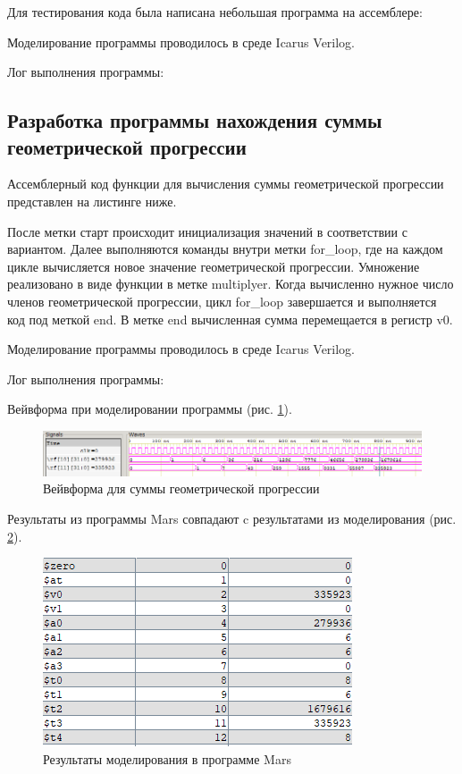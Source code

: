 \documentclass[a4paper,14pt]{article}
\begin{document}
	Для тестирования кода была написана небольшая программа на ассемблере:
		
	{\small {}}
	
	Моделирование программы проводилось в среде Icarus Verilog.
	
	Лог выполнения программы:
	
	{\small {}}
	
	\subsection{Разработка программы нахождения суммы геометрической прогрессии}
	
	Ассемблерный код функции для вычисления суммы геометрической прогрессии представлен на листинге ниже.
	
	{\small {}}
	
	После метки старт происходит инициализация значений в соответствии с вариантом.
	Далее выполняются команды внутри метки for\_loop, где на каждом цикле вычисляется новое значение геометрической прогрессии.
	Умножение реализовано в виде функции в метке multiplyer.
	Когда вычисленно нужное число членов геометрической прогрессии, цикл for\_loop завершается и выполняется код под меткой end.
	В метке end вычисленная сумма перемещается в регистр v0.
	
	Моделирование программы проводилось в среде Icarus Verilog.
	
	Лог выполнения программы:
	
	{\small {}}
	
	Вейвформа при моделировании программы (рис. \ref{fig:99wvf}).
	
	\begin{figure}[H]
		\centering
		\includegraphics[width=0.95\linewidth]{images/99_wvf}
		\caption{Вейвформа для суммы геометрической прогрессии}
		\label{fig:99wvf}
	\end{figure}

	Результаты из программы Mars совпадают c результатами из моделирования (рис. \ref{fig:99mars}).

	\begin{figure}[H]
		\centering
		\includegraphics[width=0.5\linewidth]{images/99_mars}
		\caption{Результаты моделирования в программе Mars}
		\label{fig:99mars}
	\end{figure}
\end{document}
